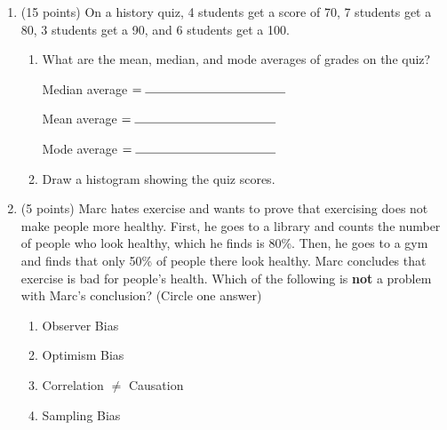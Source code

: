 \documentclass[11pt]{article}
\begin{document}
\begin{enumerate}
\newpage

\item (15 points) On a history quiz, 4 students get a score of 70, 7 students get a 80, 3 students get a 90, and 6 students get a 100.

\begin{enumerate}[itemsep=20pt, label={\alph*)}]
    \item What are the mean, median, and mode averages of grades on the quiz? 
\vspace{60pt}    
\begin{flushright}
Median average $ = \rule{4cm}{0.4pt}$ \\
\end{flushright}
\begin{flushright}
Mean average $ = \rule{4cm}{0.4pt}$ \\
\end{flushright}
\begin{flushright}
Mode average $ = \rule{4cm}{0.4pt}$ \\
\end{flushright}
    \item Draw a histogram showing the quiz scores.
\end{enumerate}

\begin{center}
\end{center}

\vspace{20pt}


\item (5 points) Marc hates exercise and wants to prove that exercising does not make people more healthy. First, he goes to a library and counts the number of people who look healthy, which he finds is 80\%. Then, he goes to a gym and finds that only 50\% of people there look healthy. Marc concludes that exercise is bad for people's health. Which of the following is \textbf{not} a problem with Marc's conclusion? (Circle one answer)

\begin{enumerate}[itemsep=0pt, label={\alph*)}]
    \item Observer Bias
    \item Optimism Bias
    \item Correlation $\neq$ Causation
    \item Sampling Bias
\end{enumerate}




\end{enumerate}
\end{document}
